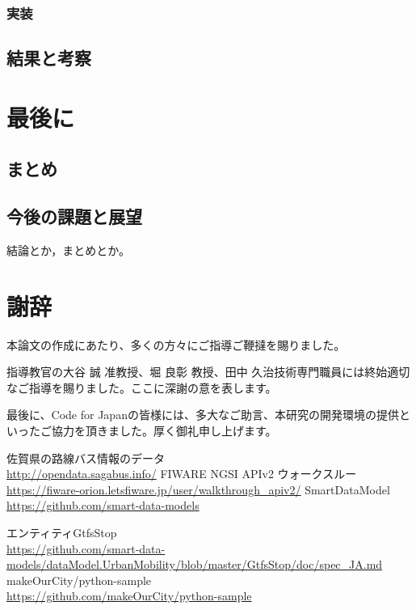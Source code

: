 \documentclass[a4paper, 12pt]{jsreport}
\begin{document}
  \subsection{実装}
  \section{結果と考察}


  \chapter{最後に}
  \section{まとめ}
  \par
  \section{今後の課題と展望}
  \par 結論とか，まとめとか。

  \chapter*{謝辞}
  本論文の作成にあたり、多くの方々にご指導ご鞭撻を賜りました。

  指導教官の大谷 誠 准教授、堀 良彰 教授、田中 久治技術専門職員には終始適切なご指導を賜りました。ここに深謝の意を表します。

  最後に、Code for
  Japanの皆様には、多大なご助言、本研究の開発環境の提供といったご協力を頂きました。厚く御礼申し上げます。

  \begin{thebibliography}{99}
     佐賀県の路線バス情報のデータ\\
    \url{http://opendata.sagabus.info/}
     FIWARE NGSI APIv2 ウォークスルー\\ \url{https://fiware-orion.letsfiware.jp/user/walkthrough_apiv2/}
     SmartDataModel\\
    \url{https://github.com/smart-data-models}

     エンティティGtfsStop\\
    \url{https://github.com/smart-data-models/dataModel.UrbanMobility/blob/master/GtfsStop/doc/spec_JA.md}
     makeOurCity/python-sample\\ \url{https://github.com/makeOurCity/python-sample}
  \end{thebibliography}
\end{document}
